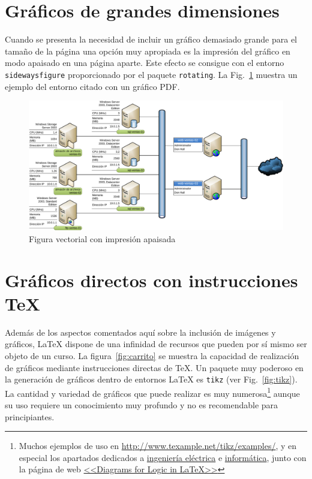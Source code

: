 \documentclass[11pt,a4paper]{article}
\begin{document}
\section{Gráficos de grandes dimensiones}
Cuando se presenta la necesidad de incluir un gráfico demasiado grande para el tamaño de la página una opción muy apropiada es la impresión del gráfico en modo apaisado en una página aparte. Este efecto se consigue con el entorno \texttt{sidewaysfigure} proporcionado por el paquete \texttt{rotating}. La Fig.~\ref{fig:sideways} muestra un ejemplo del entorno citado con un gráfico PDF.

\begin{figure}
	\centering
	\includegraphics[width=19cm]{network} 
	\caption[Gráfico de apaisado Visio]{Figura vectorial con impresión apaisada}
	\label{fig:sideways}
\end{figure}



\newpage
\section{Gráficos directos con instrucciones \TeX}
Además de los aspectos comentados aquí sobre la inclusión de imágenes y gráficos, \LaTeX{} dispone de una infinidad de recursos que pueden por sí mismo ser objeto de un curso. La figura~\ref{fig:carrito} se muestra la capacidad de realización de gráficos mediante instrucciones directas de \TeX{}. Un paquete muy poderoso en la generación de gráficos dentro de entornos \LaTeX{} es \texttt{tikz} (ver Fig.~\ref{fig:tikz}). La cantidad y variedad de gráficos que puede realizar es muy numerosa\footnote{Muchos ejemplos de uso en \url{http://www.texample.net/tikz/examples/}, y en especial los apartados dedicados a \href{http://www.texample.net/tikz/examples/area/electrical-engineering/}{ingeniería eléctrica} e \href{http://www.texample.net/tikz/examples/area/computer-science/}{informática}, junto con la página de web \href{https://www.kleemans.ch/diagrams-for-logic-in-latex}{<<Diagrams for Logic in \LaTeX>>}} aunque su uso requiere un conocimiento muy profundo y no es recomendable para principiantes.
\end{document}
